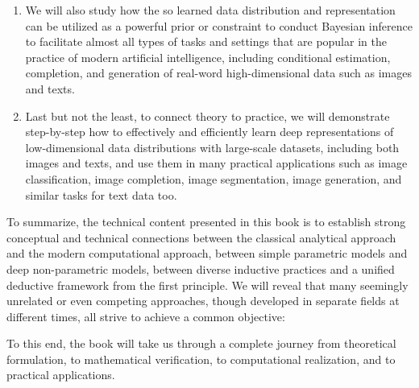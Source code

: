\documentclass[../../book-main.tex]{subfiles}
\begin{document}
\begin{enumerate}
\item We will also study how the so learned data distribution and representation can be utilized as a powerful prior or constraint to conduct Bayesian inference to facilitate almost all types of tasks and settings that are popular in the practice of modern artificial intelligence, including conditional estimation, completion, and generation of real-word high-dimensional data such as images and texts. 

\item Last but not the least, to connect theory to practice, we will demonstrate step-by-step how to effectively and efficiently learn deep representations of low-dimensional data distributions with large-scale datasets, including both images and texts, and use them in many practical applications such as image classification, image completion, image segmentation, image generation, and similar tasks for text data too. 
\end{enumerate}

To summarize, the technical content presented in this book is to establish strong conceptual and technical connections between the classical analytical approach and the modern computational approach, between simple parametric models and deep non-parametric models, between diverse inductive practices and a unified deductive framework from the first principle. We will reveal that many seemingly unrelated or even competing approaches, though developed in separate fields at different times, all strive to achieve a common objective: 
\begin{quote}
\end{quote}
To this end, the book will take us through a complete journey from theoretical formulation, to mathematical verification, to computational realization, and to practical applications.
\end{document}
